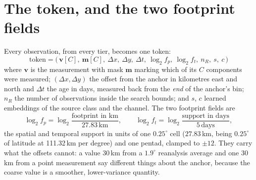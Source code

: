 \documentclass[10pt]{article}
\begin{document}
\section{The token, and the two footprint fields}

Every observation, from every tier, becomes one token:
\begin{equation}
\mathrm{token} = \big(\,\mathbf{v}[C],\ \mathbf{m}[C],\ \Delta x,\ \Delta y,\ \Delta t,\ \log_2 f_p,\ \log_2 f_t,\ n_R,\ s,\ c\,\big)
\end{equation}
where $\mathbf{v}$ is the measurement with mask $\mathbf{m}$ marking which of
its $C$ components were measured; $(\Delta x, \Delta y)$ the offset from the
anchor in kilometres east and north and $\Delta t$ the age in days, measured
back from the \emph{end} of the anchor's bin; $n_R$ the number of observations
inside the search bounds; and $s$, $c$ learned embeddings of the source class
and the channel. The two footprint fields are
\begin{equation}
\log_2 f_p = \log_2\!\frac{\text{footprint in km}}{27.83\,\text{km}}, \qquad
\log_2 f_t = \log_2\!\frac{\text{support in days}}{5\,\text{days}},
\end{equation}
the spatial and temporal support in units of one $0.25^\circ$ cell
($27.83$\,km, being $0.25^\circ$ of latitude at 111.32\,km per degree) and one
pentad, clamped to $\pm 12$. They carry what the offsets cannot: a value 30\,km
from a $1.9^\circ$ reanalysis average and one 30\,km from a point measurement
say different things about the anchor, because the coarse value is a smoother,
lower-variance quantity.
\end{document}
